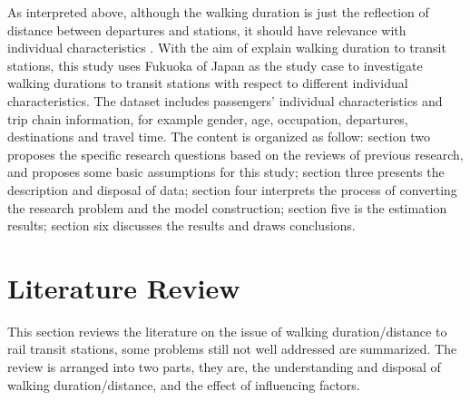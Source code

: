 \documentclass[Journal,letterpaper]{ascelike-new}
\begin{document}
%
As interpreted above, although the walking duration is just the reflection of distance between departures and stations, it should have relevance with individual characteristics \cite{besser2005walking,daniels2013explaining,guerra2012half,larsen2010beyond,yang2012walking,krygsman2004multimodal}. With the aim of explain walking duration to transit stations, this study uses Fukuoka of Japan as the study case to investigate walking durations to transit stations with respect to different individual characteristics. The dataset includes passengers' individual characteristics and trip chain information, for example gender, age, occupation, departures, destinations and travel time. The content is organized as follow: section two proposes the specific research questions based on the reviews of previous research, and proposes some basic assumptions for this study; section three presents the description and disposal of data; section four interprets the process of converting the research problem and the model construction; section five is the estimation results; section six discusses the results and draws conclusions. 

%
\section{Literature Review}
%
This section reviews the literature on the issue of walking duration/distance to rail transit stations, some problems still not well addressed are summarized. The review is arranged into two parts, they are, the understanding and disposal of walking duration/distance, and the effect of influencing factors.

%
\end{document}
